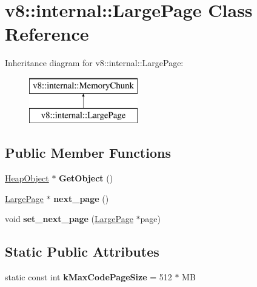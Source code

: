 \hypertarget{classv8_1_1internal_1_1_large_page}{}\section{v8\+:\+:internal\+:\+:Large\+Page Class Reference}
\label{classv8_1_1internal_1_1_large_page}
Inheritance diagram for v8\+:\+:internal\+:\+:Large\+Page\+:\begin{figure}[H]
\begin{center}
\leavevmode
\includegraphics[height=2.000000cm]{classv8_1_1internal_1_1_large_page}
\end{center}
\end{figure}
\subsection*{Public Member Functions}
\begin{DoxyCompactItemize}
\item 
\hyperlink{classv8_1_1internal_1_1_heap_object}{Heap\+Object} $\ast$ {\bfseries Get\+Object} ()\hypertarget{classv8_1_1internal_1_1_large_page_a026fc2be5e3555b093f226c43e36e93e}{}\label{classv8_1_1internal_1_1_large_page_a026fc2be5e3555b093f226c43e36e93e}

\item 
\hyperlink{classv8_1_1internal_1_1_large_page}{Large\+Page} $\ast$ {\bfseries next\+\_\+page} ()\hypertarget{classv8_1_1internal_1_1_large_page_a4853902bc7c2f196b3e31cfceb8c605c}{}\label{classv8_1_1internal_1_1_large_page_a4853902bc7c2f196b3e31cfceb8c605c}

\item 
void {\bfseries set\+\_\+next\+\_\+page} (\hyperlink{classv8_1_1internal_1_1_large_page}{Large\+Page} $\ast$page)\hypertarget{classv8_1_1internal_1_1_large_page_adb319c31470cbbac208f8dd772b9d212}{}\label{classv8_1_1internal_1_1_large_page_adb319c31470cbbac208f8dd772b9d212}

\end{DoxyCompactItemize}
\subsection*{Static Public Attributes}
\begin{DoxyCompactItemize}
\item 
static const int {\bfseries k\+Max\+Code\+Page\+Size} = 512 $\ast$ MB\hypertarget{classv8_1_1internal_1_1_large_page_ac2fb864e1fbbebf13d482e121c110f36}{}\label{classv8_1_1internal_1_1_large_page_ac2fb864e1fbbebf13d482e121c110f36}

\end{DoxyCompactItemize}
